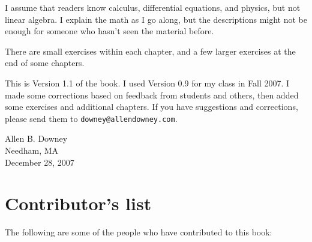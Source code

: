 \documentclass{book}
\begin{document}
I assume that readers know calculus, differential equations, and
physics, but not linear algebra. I explain the math as I go along,
but the descriptions might not be enough for someone who hasn't seen
the material before.

There are small exercises within each chapter, and a few larger
exercises at the end of some chapters.

This is Version 1.1 of the book. I used Version 0.9 for my class
in Fall 2007. I made some corrections based on feedback from students
and others, then added some exercises and additional chapters.
If you have suggestions and corrections, please send them to
{\tt downey@allendowney.com}.

\noindent Allen B. Downey \\
\noindent Needham, MA \\
\noindent December 28, 2007

\vspace{0.1in}

\section*{Contributor's list}

The following are some of the people who have contributed to this
book:
\end{document}
